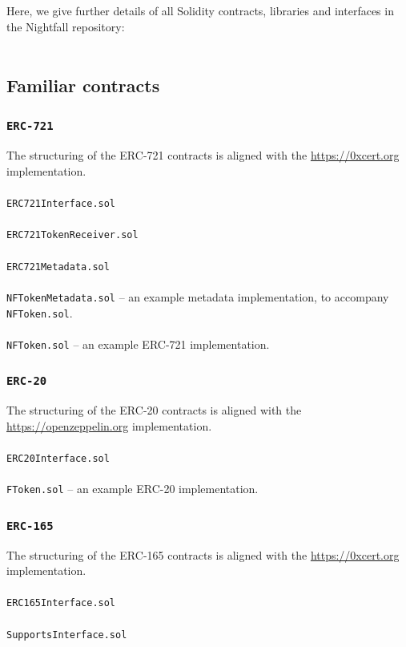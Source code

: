 \documentclass{article}
\begin{document}
Here, we give further details of all Solidity contracts, libraries and interfaces in the Nightfall repository:\\
\\
\subsection{Familiar contracts}

\subsubsection{\texttt{ERC-721}}
The structuring of the ERC-721 contracts is aligned with the \url{https://0xcert.org} implementation.\\
\\
\texttt{ERC721Interface.sol}\\
\\
\texttt{ERC721TokenReceiver.sol}\\
\\
\texttt{ERC721Metadata.sol}\\
\\
\texttt{NFTokenMetadata.sol} -- an example metadata implementation, to accompany \texttt{NFToken.sol}.\\
\\
\texttt{NFToken.sol} -- an example ERC-721 implementation.\\

\subsubsection{\texttt{ERC-20}}
The structuring of the ERC-20 contracts is aligned with the \url{https://openzeppelin.org} implementation.\\
\\
\texttt{ERC20Interface.sol}\\
\\
\texttt{FToken.sol} -- an example ERC-20 implementation.\\

\subsubsection{\texttt{ERC-165}}
The structuring of the ERC-165 contracts is aligned with the \url{https://0xcert.org} implementation.\\
\\
\texttt{ERC165Interface.sol}\\
\\
\texttt{SupportsInterface.sol}\\
\end{document}

